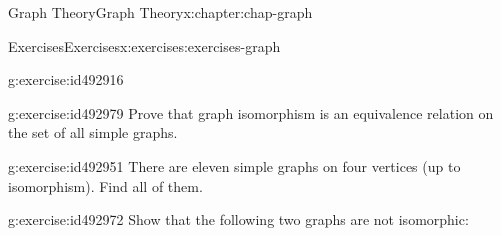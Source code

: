 \documentclass[oneside,10pt,]{book}
\numberwithin{equation}{section}
\begin{document}
\begin{chapterptx}{Graph Theory}{}{Graph Theory}{}{}{x:chapter:chap-graph}
\begin{exercises-section}{Exercises}{}{Exercises}{}{}{x:exercises:exercises-graph}
\begin{divisionexercise}{13}{}{}{g:exercise:id492916}
\begin{sidebyside}{3}{0.0366666666666667}{0.0366666666666667}{0.0733333333333333}
\begin{sbspanel}{0.25}
{
}%
\end{sbspanel}%
\end{sidebyside}%
\end{divisionexercise}%
\begin{divisionexercise}{14}{}{}{g:exercise:id492979}%
Prove that graph isomorphism is an equivalence relation on the set of all simple graphs.%
\end{divisionexercise}%
\begin{divisionexercise}{15}{}{}{g:exercise:id492951}%
There are eleven simple graphs on four vertices (up to isomorphism). Find all of them.%
\end{divisionexercise}%
\begin{divisionexercise}{16}{}{}{g:exercise:id492972}%
Show that the following two graphs are not isomorphic:%
\begin{sidebyside}{2}{0.3}{0.3}{0.06}%
\begin{sbspanel}{0.17}%
\end{sbspanel}
\end{sidebyside}
\end{divisionexercise}
\end{exercises-section}
\end{chapterptx}
\end{document}
